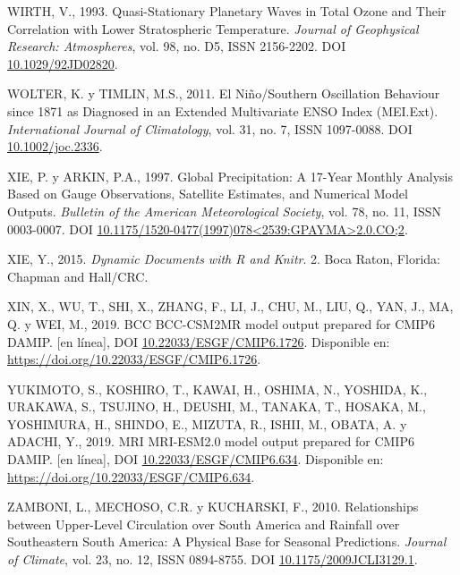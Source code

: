 \documentclass[12pt,oneside,a4paper]{reedthesis}
\newlength{\cslhangindent}
\newenvironment{CSLReferences}[2] %
 {%
  \setlength{\parindent}{0pt}
  \ifodd #1 \everypar{\setlength{\hangindent}{\cslhangindent}}\ignorespaces\fi
  \ifnum #2 > 0
  \setlength{\parskip}{#2\baselineskip}
  \fi
 }%
 {}
\begin{document}
\begin{CSLReferences}{1}{0}
\leavevmode{}%
WIRTH, V., 1993. Quasi-Stationary Planetary Waves in Total Ozone and Their Correlation with Lower Stratospheric Temperature. \emph{Journal of Geophysical Research: Atmospheres}, vol. 98, no. D5, ISSN 2156-2202. DOI \href{https://doi.org/10.1029/92JD02820}{10.1029/92JD02820}.

\leavevmode{}%
WOLTER, K. y TIMLIN, M.S., 2011. El {Ni{ñ}o}/{Southern Oscillation} Behaviour since 1871 as Diagnosed in an Extended Multivariate {ENSO} Index ({MEI}.Ext). \emph{International Journal of Climatology}, vol. 31, no. 7, ISSN 1097-0088. DOI \href{https://doi.org/10.1002/joc.2336}{10.1002/joc.2336}.

\leavevmode{}%
XIE, P. y ARKIN, P.A., 1997. Global {Precipitation}: {A} 17-{Year Monthly Analysis Based} on {Gauge Observations}, {Satellite Estimates}, and {Numerical Model Outputs}. \emph{Bulletin of the American Meteorological Society}, vol. 78, no. 11, ISSN 0003-0007. DOI \href{https://doi.org/10.1175/1520-0477(1997)078\%3C2539:GPAYMA\%3E2.0.CO;2}{10.1175/1520-0477(1997)078\textless2539:GPAYMA\textgreater2.0.CO;2}.

\leavevmode{}%
XIE, Y., 2015. \emph{Dynamic Documents with {R} and Knitr}. 2. Boca Raton, Florida: {Chapman and Hall/CRC}.

\leavevmode{}%
XIN, X., WU, T., SHI, X., ZHANG, F., LI, J., CHU, M., LIU, Q., YAN, J., MA, Q. y WEI, M., 2019. BCC BCC-CSM2MR model output prepared for CMIP6 DAMIP. {[}en línea{]}, DOI \href{https://doi.org/10.22033/ESGF/CMIP6.1726}{10.22033/ESGF/CMIP6.1726}. Disponible en: \url{https://doi.org/10.22033/ESGF/CMIP6.1726}.

\leavevmode{}%
YUKIMOTO, S., KOSHIRO, T., KAWAI, H., OSHIMA, N., YOSHIDA, K., URAKAWA, S., TSUJINO, H., DEUSHI, M., TANAKA, T., HOSAKA, M., YOSHIMURA, H., SHINDO, E., MIZUTA, R., ISHII, M., OBATA, A. y ADACHI, Y., 2019. MRI MRI-ESM2.0 model output prepared for CMIP6 DAMIP. {[}en línea{]}, DOI \href{https://doi.org/10.22033/ESGF/CMIP6.634}{10.22033/ESGF/CMIP6.634}. Disponible en: \url{https://doi.org/10.22033/ESGF/CMIP6.634}.

\leavevmode{}%
ZAMBONI, L., MECHOSO, C.R. y KUCHARSKI, F., 2010. Relationships between {Upper-Level Circulation} over {South America} and {Rainfall} over {Southeastern South America}: {A Physical Base} for {Seasonal Predictions}. \emph{Journal of Climate}, vol. 23, no. 12, ISSN 0894-8755. DOI \href{https://doi.org/10.1175/2009JCLI3129.1}{10.1175/2009JCLI3129.1}.


\end{CSLReferences}
\end{document}

